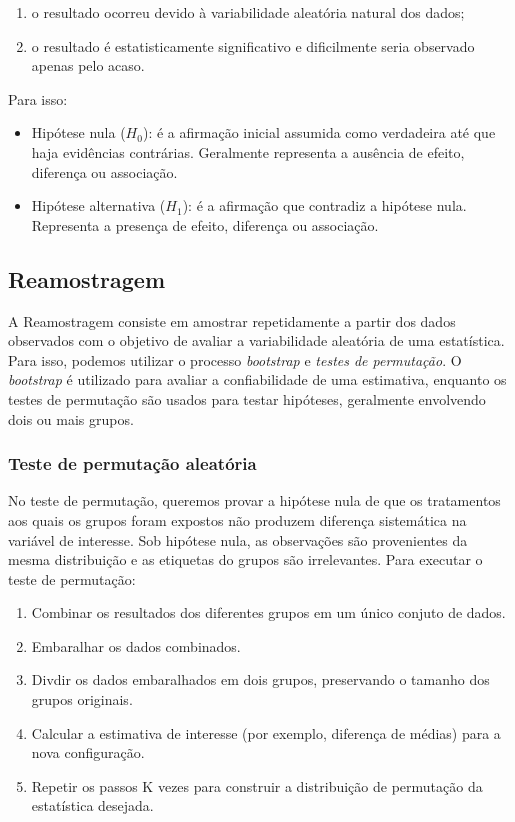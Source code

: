 \documentclass{article}
\begin{document}
\begin{enumerate}
    \item o resultado ocorreu devido à variabilidade aleatória natural dos dados;
    \item  o resultado é estatisticamente significativo e dificilmente seria observado apenas pelo acaso.
\end{enumerate}

Para isso:

\begin{itemize}
    \item Hipótese nula ($H_0$): é a afirmação inicial assumida como verdadeira até que haja evidências contrárias. Geralmente representa a ausência de efeito, diferença ou associação.
    \item Hipótese alternativa ($H_1$): é a afirmação que contradiz a hipótese nula. Representa a presença de efeito, diferença ou associação.
\end{itemize}

\subsection{Reamostragem}

A Reamostragem consiste em amostrar repetidamente a partir dos dados observados com o objetivo de avaliar a variabilidade aleatória de uma estatística. Para isso, podemos utilizar o processo \textit{bootstrap} e \textit{testes de permutação}. O \textit{bootstrap} é utilizado para avaliar a confiabilidade de uma estimativa, enquanto os testes de permutação são usados para testar hipóteses, geralmente envolvendo dois ou mais grupos.

\subsubsection{Teste de permutação aleatória}

No teste de permutação, queremos provar a hipótese nula de que os tratamentos aos quais os grupos foram expostos não produzem diferença sistemática na variável de interesse. Sob hipótese nula, as observações são provenientes da mesma distribuição e as etiquetas do grupos são irrelevantes. Para executar o teste de permutação:

\begin{enumerate}
    \item Combinar os resultados dos diferentes grupos em um único conjuto de dados.
    \item Embaralhar os dados combinados.
    \item Divdir os dados embaralhados em dois grupos, preservando o tamanho dos grupos originais.
    \item Calcular a estimativa de interesse (por exemplo, diferença de médias) para a nova configuração.
    \item Repetir os passos K vezes para  construir a distribuição de permutação da estatística desejada.
\end{enumerate}
\end{document}
